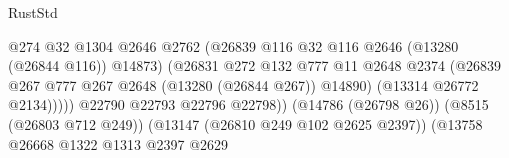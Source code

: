 \begin{lexlean}{RustStd}
\begin{coremodule}
                                                          @274
                                                          @32
                                                          @1304
                                                          @2646
                                                          @2762
                                                          (@26839
                                                            @116
                                                            @32
                                                            @116
                                                            @2646
                                                            (@13280 (@26844 @116))
                                                            @14873)
                                                          (@26831
                                                            @272
                                                            @132
                                                            @777
                                                            @11
                                                            @2648
                                                            @2374
                                                            (@26839
                                                              @267
                                                              @777
                                                              @267
                                                              @2648
                                                              (@13280 (@26844 @267))
                                                              @14890)
                                                            (@13314 @26772 @2134)))))
                                                    @22790
                                                    @22793
                                                    @22796
                                                    @22798))
                                                (@14786 (@26798 @26))
                                                (@8515 (@26803 @712 @249))
                                                (@13147 (@26810 @249 @102 @2625 @2397))
                                                (@13758
                                                  @26668
                                                  @1322
                                                  @1313
                                                  @2397
                                                  @2629

\end{coremodule}
\end{lexlean}
